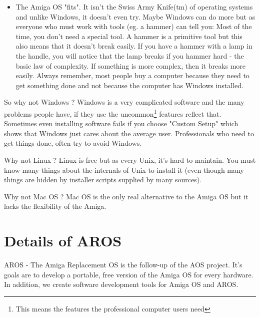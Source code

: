 \begin{itemize}
\item The Amiga OS "fits". It isn't the Swiss Army Knife(tm) of operating
systems and unlike Windows, it doesn't even try. Maybe Windows can do more
but as everyone who must work with tools (eg. a hammer) can tell you: Most
of the time, you don't need a special tool. A hammer is a primitive tool
but this also means that it doesn't break easily. If you have a hammer
with a lamp in the handle, you will notice that the lamp breaks if you
hammer hard - the basic law of complexity. If something is more complex,
then it breaks more easily. Always remember, most people buy a computer
because they need to get something done and not because the computer has
Windows installed.

\end{itemize}

So why not Windows ? Windows is a very complicated software and the many
problems people have, if they use the uncommon\footnote{This means the
features the professional computer users need} features reflect that.
Sometimes even installing software fails if you choose "Custom Setup" which
shows that Windows just cares about the average user. Professionals who
need to get things done, often try to avoid Windows.

Why not Linux ? Linux is free but as every Unix, it's hard to maintain.
You must know many things about the internals of Unix to install it
(even though many things are hidden by installer scripts supplied by many
sources).

Why not Mac OS ? Mac OS is the only real alternative to the Amiga OS but it
lacks the flexibility of the Amiga.

\section{Details of AROS}

AROS - The Amiga Replacement OS is the follow-up of the AOS project.
It's goals are to develop a portable, free version of the Amiga OS for
every hardware. In addition, we create software development tools for
Amiga OS and AROS.

